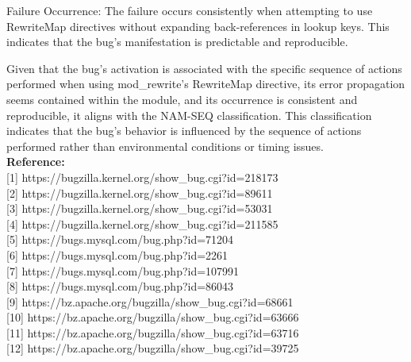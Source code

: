 \documentclass[12pt]{article}
\numberwithin{table}{section}
\begin{document}
	Failure Occurrence: The failure occurs consistently when attempting to use RewriteMap directives without expanding back-references in lookup keys. This indicates that the bug's manifestation is predictable and reproducible.
	
	Given that the bug's activation is associated with the specific sequence of actions performed when using mod\_rewrite's RewriteMap directive, its error propagation seems contained within the module, and its occurrence is consistent and reproducible, it aligns with the NAM-SEQ classification. This classification indicates that the bug's behavior is influenced by the sequence of actions performed rather than environmental conditions or timing issues.\\
	
	\newpage
	\textbf{\large Reference:}\\
	{\small [1] https://bugzilla.kernel.org/show\_bug.cgi?id=218173}\\
	{\small [2] https://bugzilla.kernel.org/show\_bug.cgi?id=89611}\\
	{\small [3] https://bugzilla.kernel.org/show\_bug.cgi?id=53031}\\
	{\small [4] https://bugzilla.kernel.org/show\_bug.cgi?id=211585}\\
	{\small [5] https://bugs.mysql.com/bug.php?id=71204}\\
	{\small [6] https://bugs.mysql.com/bug.php?id=2261}\\
	{\small [7] https://bugs.mysql.com/bug.php?id=107991}\\
	{\small [8] https://bugs.mysql.com/bug.php?id=86043}\\
	{\small [9] https://bz.apache.org/bugzilla/show\_bug.cgi?id=68661}\\
	{\small [10] https://bz.apache.org/bugzilla/show\_bug.cgi?id=63666}\\
	{\small [11] https://bz.apache.org/bugzilla/show\_bug.cgi?id=63716}\\
	{\small [12] https://bz.apache.org/bugzilla/show\_bug.cgi?id=39725}\\
	
	
	
	
\end{document}
